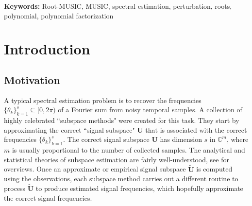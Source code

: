 \documentclass[11pt]{article}
\theoremstyle{definition}
\numberwithin{theorem}{section}
\numberwithin{equation}{section}
\def\C{\mathbb{C}}
\renewcommand{\subset}{\subseteq}
\renewcommand{\tilde}{\widetilde}
\newcommand{\bfU}{{\boldsymbol U}}
\newcommand{\noteW}[1]{\textcolor{purple}{{\textbf{Weilin:} #1}}}
\numberwithin{equation}{section}
\begin{document}
        


\medskip
\noindent
{\bf Keywords:} Root-MUSIC, MUSIC, spectral estimation, perturbation, roots, polynomial, polynomial factorization

\section{Introduction} 

\subsection{Motivation} 

A typical spectral estimation problem is to recover the frequencies $\{\theta_k\}_{k=1}^s\subset [0,2\pi)$ of a Fourier sum from noisy temporal samples. A collection of highly celebrated ``subspace methods" \cite{schmidt1986multiple,barabell1983improving,kailath1989esprit,hua1990matrixpencil} were created for this task. They start by approximating the correct ``signal subspace" $\bfU$ that is associated with the correct frequencies $\{\theta_k\}_{k=1}^s$. The correct signal subspace $\bfU$ has dimension $s$ in $\C^m$, where $m$ is usually proportional to the number of collected samples. The analytical and statistical theories of subspace estimation are fairly well-understood, see \cite{stewart1990matrix,chen2021spectral} for overviews. Once an approximate or empirical signal subspace $\tilde \bfU$ is computed using the observations, each subspace method carries out a different routine to process $\tilde\bfU$ to produce estimated signal frequencies, which hopefully approximate the correct signal frequencies. 
\end{document}
